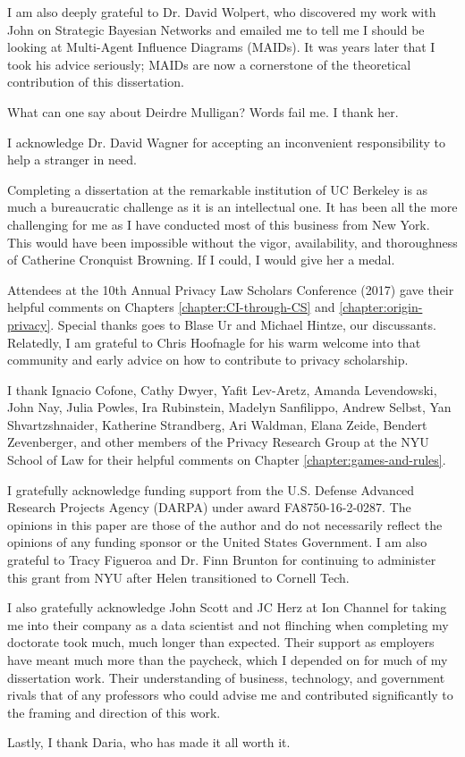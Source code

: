 \documentclass[../thesis.tex]{subfiles}
\begin{document}
 I am also deeply grateful to Dr. David Wolpert, who discovered
 my work with John on Strategic Bayesian Networks
 and emailed me to tell me I should be looking at
 Multi-Agent Influence Diagrams (MAIDs).
 It was years later that I took his advice seriously;
 MAIDs are now a cornerstone of the theoretical contribution
 of this dissertation.

 What can one say about Deirdre Mulligan?
 Words fail me.
 I thank her.

 I acknowledge Dr. David Wagner for accepting an
 inconvenient responsibility to help a stranger in need.

 Completing a dissertation at the remarkable institution
 of UC Berkeley is as much a bureaucratic challenge as it
 is an intellectual one.
 It has been all the more challenging for me as I have conducted
 most of this business from New York.
 This would have been impossible without the vigor, availability,
 and thoroughness of Catherine Cronquist Browning.
 If I could, I would give her a medal.
 
 Attendees at the 10th Annual Privacy Law Scholars Conference
 (2017) gave their helpful comments on
 Chapters \ref{chapter:CI-through-CS} and
 \ref{chapter:origin-privacy}.
 Special thanks goes to Blase Ur and Michael Hintze,
 our discussants.
 Relatedly, I am grateful to Chris Hoofnagle for his warm
 welcome into that community and early advice
 on how to contribute to privacy scholarship.

 I thank Ignacio Cofone, Cathy Dwyer, Yafit Lev-Aretz,
 Amanda Levendowski, John Nay, Julia Powles,
 Ira Rubinstein, Madelyn Sanfilippo, Andrew Selbst,
 Yan Shvartzshnaider,
 Katherine Strandberg, Ari Waldman, Elana Zeide,
 Bendert Zevenberger,  
 and other members of the Privacy Research Group at
 the NYU School of Law for their helpful comments
 on Chapter \ref{chapter:games-and-rules}.
 
 I gratefully acknowledge funding support 
 from the U.S. Defense Advanced Research Projects Agency (DARPA)
 under award FA8750-16-2-0287.
 The opinions in this paper are those of the author and do not
 necessarily reflect the opinions of any funding sponsor
 or the United States Government.
 I am also grateful to Tracy Figueroa and Dr. Finn Brunton
 for continuing to administer this grant from NYU after
 Helen transitioned to Cornell Tech.
 
 I also gratefully acknowledge John Scott and JC Herz
 at Ion Channel
 for taking me into their company as a data scientist and
 not flinching when completing my doctorate took much,
 much longer than expected.
 Their support as employers have meant much more than the paycheck,
 which I depended on for much of my dissertation work.
 Their understanding of business, technology, and government
 rivals that of any professors who could advise me
 and contributed significantly to the framing and direction
 of this work.
 
 Lastly, I thank Daria, who has made it all worth it.
\end{document}
